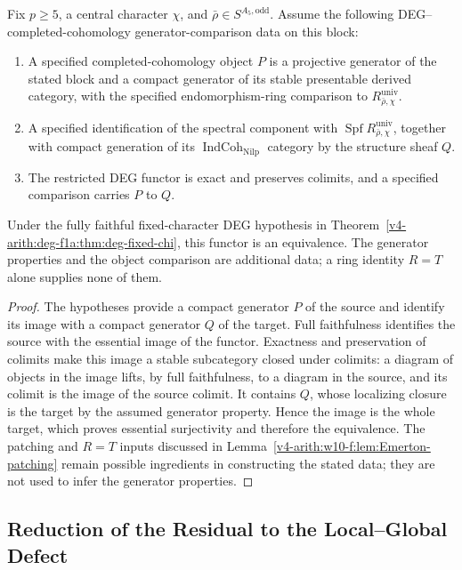\begin{theorem}
\label{v4-arith:w10-f:thm:A5-odd-closure}
Fix \(p\geq5\), a central character \(\chi\), and
\(\bar\rho\in S^{A_5,\mathrm{odd}}\). Assume the following
DEG--completed-cohomology generator-comparison data on this block:
\begin{enumerate}
\item A specified completed-cohomology object \(P\) is a projective
generator of the stated block and a compact generator of its stable
presentable derived category, with the specified endomorphism-ring
comparison to \(R^{\mathrm{univ}}_{\bar\rho,\chi}\).
\item A specified identification of the spectral component with
\(\operatorname{Spf}R^{\mathrm{univ}}_{\bar\rho,\chi}\), together with
compact generation of its \(\operatorname{IndCoh}_{\mathrm{Nilp}}\)
category by the structure sheaf \(Q\).
\item The restricted DEG functor is exact and preserves colimits,
and a specified comparison carries \(P\) to \(Q\).
\end{enumerate}
Under the fully faithful fixed-character DEG hypothesis in
Theorem~\ref{v4-arith:deg-f1a:thm:deg-fixed-chi}, this functor is an
equivalence. The generator properties and the object comparison are
additional data; a ring identity \(R=T\) alone supplies none of them.
\end{theorem}
\begin{proof}
The hypotheses provide a compact generator \(P\) of the source and
identify its image with a compact generator \(Q\) of the target.
Full faithfulness identifies the source with the essential image of
the functor. Exactness and preservation of colimits make this image
a stable subcategory closed under colimits: a diagram of objects in
the image lifts, by full faithfulness, to a diagram in the source,
and its colimit is the image of the source colimit.
It contains \(Q\), whose localizing closure is the target by the
assumed generator property. Hence the image is the whole target,
which proves essential surjectivity and therefore the equivalence.
The patching and \(R=T\) inputs discussed in
Lemma~\ref{v4-arith:w10-f:lem:Emerton-patching}
remain possible ingredients in constructing the stated data; they
are not used to infer the generator properties.
\end{proof}

\subsection{Reduction of the Residual to the Local--Global Defect}
\label{v4-arith:w10-f:ns-reduction}

